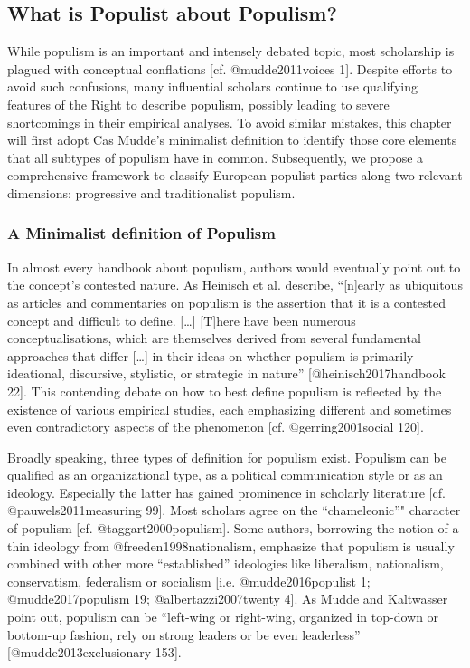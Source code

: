 \documentclass[]{article}
\title{}
\author{}
\date{}
\begin{document}
\subsection*{What is Populist about
Populism?}\label{what-is-populist-about-populism}

While populism is an important and intensely debated topic, most
scholarship is plagued with conceptual conflations {[}cf.
@mudde2011voices 1{]}. Despite efforts to avoid such confusions, many
influential scholars continue to use qualifying features of the Right to
describe populism, possibly leading to severe shortcomings in their
empirical analyses. To avoid similar mistakes, this chapter will first
adopt Cas Mudde's minimalist definition to identify those core elements
that all subtypes of populism have in common. Subsequently, we propose a
comprehensive framework to classify European populist parties along two
relevant dimensions: progressive and traditionalist populism.

\subsubsection*{A Minimalist definition of
Populism}\label{a-minimalist-definition-of-populism}

In almost every handbook about populism, authors would eventually point
out to the concept's contested nature. As Heinisch et al. describe,
``{[}n{]}early as ubiquitous as articles and commentaries on populism is
the assertion that it is a contested concept and difficult to define.
{[}\ldots{}{]} {[}T{]}here have been numerous conceptualisations, which
are themselves derived from several fundamental approaches that differ
{[}\ldots{}{]} in their ideas on whether populism is primarily
ideational, discursive, stylistic, or strategic in nature''
{[}@heinisch2017handbook 22{]}. This contending debate on how to best
define populism is reflected by the existence of various empirical
studies, each emphasizing different and sometimes even contradictory
aspects of the phenomenon {[}cf. @gerring2001social 120{]}.

Broadly speaking, three types of definition for populism exist. Populism
can be qualified as an organizational type, as a political communication
style or as an ideology. Especially the latter has gained prominence in
scholarly literature {[}cf. @pauwels2011measuring 99{]}. Most scholars
agree on the ``chameleonic''" character of populism {[}cf.
@taggart2000populism{]}. Some authors, borrowing the notion of a thin
ideology from @freeden1998nationalism, emphasize that populism is
usually combined with other more ``established'' ideologies like
liberalism, nationalism, conservatism, federalism or socialism {[}i.e.
@mudde2016populist 1; @mudde2017populism 19; @albertazzi2007twenty 4{]}.
As Mudde and Kaltwasser point out, populism can be ``left-wing or
right-wing, organized in top-down or bottom-up fashion, rely on strong
leaders or be even leaderless'' {[}@mudde2013exclusionary 153{]}.
\end{document}
